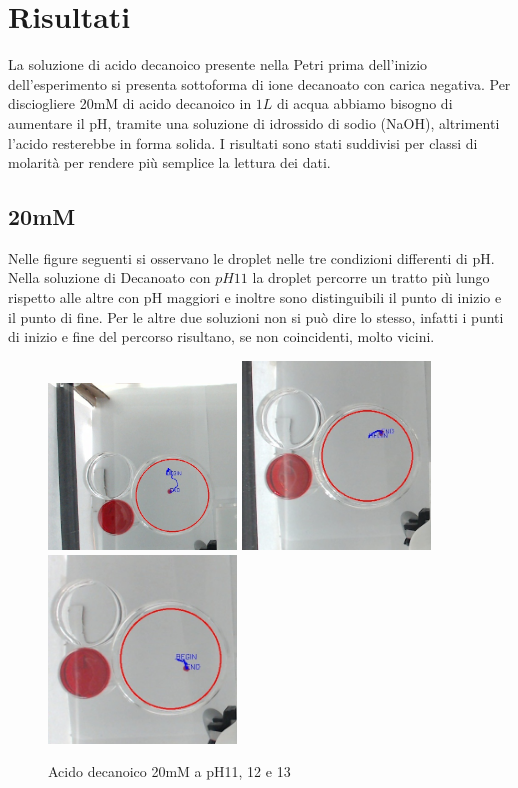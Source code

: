 \section{Risultati}
La soluzione di acido decanoico presente nella Petri prima dell'inizio dell'esperimento si presenta sottoforma di ione decanoato con carica negativa. Per disciogliere 20mM di acido decanoico in $1L$ di acqua abbiamo bisogno di aumentare il pH, tramite una soluzione di idrossido di sodio (NaOH), altrimenti l'acido resterebbe in forma solida. I risultati sono stati suddivisi per classi di molarità per rendere più semplice la lettura dei dati.

\subsection{20mM}
Nelle figure seguenti si osservano le droplet nelle tre condizioni differenti di pH. Nella soluzione di Decanoato con $pH11$ la droplet percorre un tratto più lungo rispetto alle altre con pH maggiori e inoltre sono distinguibili il punto di inizio e il punto di fine. Per le altre due soluzioni non si può dire lo stesso, infatti i punti di inizio e fine del percorso risultano, se non coincidenti, molto vicini. 
\begin{figure}[h]
	\centering
   		{\includegraphics[width=5cm]{immagini/20mMpH11-2.jpg}} %
 	\hspace{2mm}   	
		{\includegraphics[width=5cm]{immagini/20mMpH12-2.jpg}}%
	\hspace{2mm}   	
		{\includegraphics[width=5cm]{immagini/20mMpH13-2.jpg}}%
	\caption{Acido decanoico 20mM a pH11, 12 e 13}
\end{figure}
